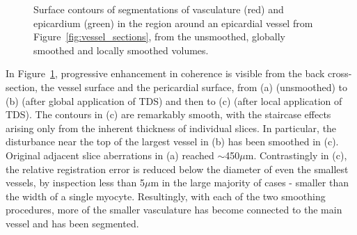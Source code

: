   \begin{figure}[!t]
    \centerline{ \hfil
     \hfil
    }
    \caption{Surface contours of segmentations of vasculature (red) and epicardium (green) in the region around an epicardial vessel from Figure~\ref{fig:vessel_sections}, from the unsmoothed, globally smoothed and locally smoothed volumes.}
    \label{fig:region_segmentations}
  \end{figure} 
  In Figure~\ref{fig:region_segmentations}, progressive enhancement in coherence is visible from the back cross-section, the vessel surface and the pericardial surface, from (a) (unsmoothed) to (b) (after global application of TDS) and then to (c) (after local application of TDS). The contours in (c) are remarkably smooth, with the staircase effects arising only from the inherent thickness of individual slices. In particular, the disturbance near the top of the largest vessel in (b) has been smoothed in (c). Original adjacent slice aberrations in (a) reached $\sim$450$\mu$m. Contrastingly in (c), the relative registration error is reduced below the diameter of even the smallest vessels, by inspection less than 5$\mu$m in the large majority of cases - smaller than the width of a single myocyte. Resultingly, with each of the two smoothing procedures, more of the smaller vasculature has become connected to the main vessel and has been segmented.
    
